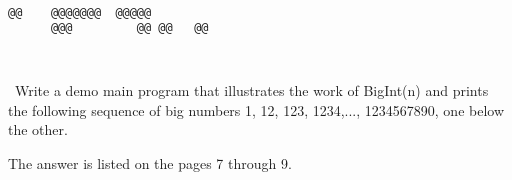 \documentclass{article}
\begin{document}
	\ttfamily
	\begin{lstlisting}[language=bash]		
	   @@ 	 @@@@@@@  @@@@@  
	  @@@  	      @@ @@   @@ 

		 
	\end{lstlisting}
	
	\rmfamily\
	Write a demo main program that illustrates the work of BigInt(n) and prints the following sequence of big numbers 1, 12, 123, 1234,..., 1234567890, one below the other.
	\newline
	
	The answer is listed on the pages 7 through 9.
	
	
\paragraph{}\
\paragraph{}\
\paragraph{}\
\paragraph{}\
\paragraph{}\
\paragraph{}\
\paragraph{}\
\paragraph{}\
\paragraph{}\
\paragraph{}\
\paragraph{}\
\paragraph{}\
\end{document}
